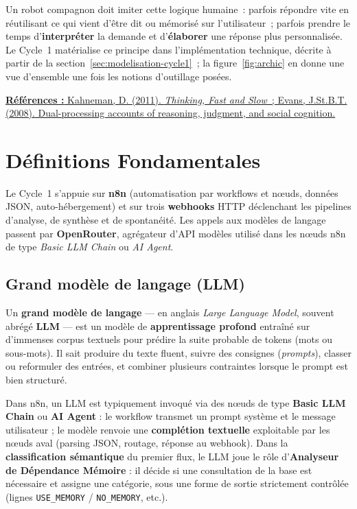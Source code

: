 \documentclass[a4paper,12pt]{report}
\newcommand{\FloatBarrier}{}
\begin{document}
	Un robot compagnon doit imiter cette logique humaine~: parfois répondre vite en
	réutilisant ce qui vient d'être dit ou mémorisé sur l'utilisateur~; parfois prendre
	le temps d'\textbf{interpréter} la demande et d'\textbf{élaborer} une réponse plus
	personnalisée. Le Cycle~1 matérialise ce principe dans l'implémentation technique,
	décrite à partir de la section~\ref{sec:modelisation-cycle1}~; la figure~\ref{fig:archic}
	en donne une vue d'ensemble une fois les notions d'outillage posées.
	
	\noindent\underline{\textbf{Références :} Kahneman, D. (2011). \textit{Thinking, Fast and Slow}~;
	Evans, J.St.B.T. (2008). Dual-processing accounts of reasoning, judgment, and social cognition.}
	\FloatBarrier
	
	\section{Définitions Fondamentales}
	
	Le Cycle~1 s'appuie sur \textbf{n8n} (automatisation par workflows et nœuds, données
	JSON, auto-hébergement) et sur trois \textbf{webhooks} HTTP déclenchant les pipelines
	d'analyse, de synthèse et de spontanéité. Les appels aux modèles de langage passent
	par \textbf{OpenRouter}, agrégateur d'API modèles utilisé dans les nœuds n8n de type
	\textit{Basic LLM Chain} ou \textit{AI Agent}.
	
	\subsection{Grand modèle de langage (LLM)}
	
	Un \textbf{grand modèle de langage} — en anglais \textit{Large Language Model}, souvent
	abrégé \textbf{LLM} — est un modèle de \textbf{apprentissage profond} entraîné sur
	d'immenses corpus textuels pour prédire la suite probable de tokens (mots ou
	sous-mots). Il sait produire du texte fluent, suivre des consignes (\textit{prompts}),
	classer ou reformuler des entrées, et combiner plusieurs contraintes lorsque le
	prompt est bien structuré.
	
	Dans n8n, un LLM est typiquement invoqué via des nœuds de type \textbf{Basic LLM Chain}
	ou \textbf{AI Agent} : le workflow transmet un prompt système et le message
	utilisateur ; le modèle renvoie une \textbf{complétion textuelle} exploitable par les
	nœuds aval (parsing JSON, routage, réponse au webhook). Dans la \textbf{classification
	sémantique} du premier flux, le LLM joue le rôle d'\textbf{Analyseur de Dépendance Mémoire} : il
	décide si une consultation de la base est nécessaire et assigne une catégorie, sous
	une forme de sortie strictement contrôlée (lignes \texttt{USE\_MEMORY} /
	\texttt{NO\_MEMORY}, etc.).
	
\end{document}
